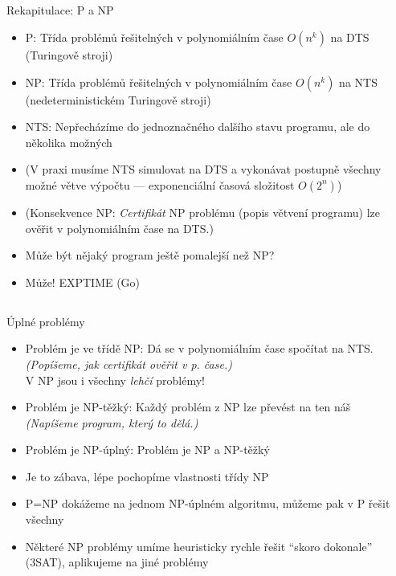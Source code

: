 \documentclass{beamer}
\begin{document}
\subsection{}
\begin{frame}{Rekapitulace: P a NP}
\begin{itemize}
\item P: Třída problémů řešitelných v polynomiálním čase $O(n^k)$ na DTS (Turingově stroji)
\item NP: Třída problémů řešitelných v polynomiálním čase $O(n^k)$ na NTS (nedeterministickém Turingově stroji)
\item NTS: Nepřecházíme do jednoznačného dalšího stavu programu, ale do několika možných
\item (V praxi musíme NTS simulovat na DTS a vykonávat postupně všechny možné větve výpočtu --- exponenciální časová složitost $O(2^n)$)
\item (Konsekvence NP: {\em Certifikát} NP problému (popis větvení programu) lze ověřit v polynomiálním čase na DTS.)
\item Může být nějaký program ještě pomalejší než NP?
\pause
\item Může! EXPTIME (Go)
\end{itemize}
\end{frame}

\subsection{}
\begin{frame}{Úplné problémy}
\begin{itemize}
\item Problém je ve třídě NP: Dá se v polynomiálním čase spočítat na NTS. \\ {\em (Popíšeme, jak certifikát ověřit v p. čase.)} \\ V NP jsou i všechny {\em lehčí} problémy!
\item Problém je NP-těžký: Každý problém z NP lze  převést na ten náš \\ {\em (Napíšeme program, který to dělá.)}
\item Problém je NP-úplný: Problém je NP a NP-těžký
\pause
\pause
\item Je to zábava, lépe pochopíme vlastnosti třídy NP
\item P=NP dokážeme na jednom NP-úplném algoritmu, můžeme pak v P řešit všechny
\item Některé NP problémy umíme heuristicky rychle řešit ``skoro dokonale'' (3SAT), aplikujeme na jiné problémy
\end{itemize}
\end{frame}
\end{document}
